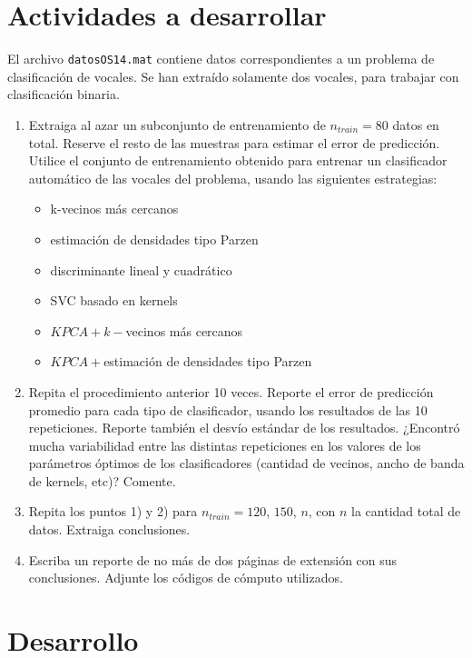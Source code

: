 \documentclass[fleqn,10pt]{SelfArx}
\begin{document}
\section*{Actividades a desarrollar} %
El archivo \texttt{datosOS14.mat} contiene datos correspondientes a un problema de clasificación de vocales. Se han extraído solamente dos vocales, para trabajar con clasificación binaria.
\begin{enumerate}
\item Extraiga al azar un subconjunto de entrenamiento de $n_{train} = 80$ datos en total. Reserve el resto de las muestras para estimar el error de predicción. Utilice el conjunto de entrenamiento obtenido para entrenar un clasificador automático de las vocales del problema, usando las siguientes estrategias:
\begin{itemize}
\item k-vecinos más cercanos
\item estimación de densidades tipo Parzen
\item discriminante lineal y cuadrático
\item SVC basado en kernels
\item $KPCA+k-$vecinos más cercanos
\item $KPCA+$estimación de densidades tipo Parzen
\end{itemize}

\item Repita el procedimiento anterior 10 veces. Reporte el error de predicción promedio para
cada tipo de clasificador, usando los resultados de las 10 repeticiones. Reporte también el desvío estándar de los resultados. ¿Encontró mucha variabilidad entre las distintas repeticiones en los valores de los parámetros óptimos de los clasificadores (cantidad de vecinos, ancho de banda de kernels, etc)? Comente.

\item Repita los puntos 1) y 2) para $n_{train} = 120$, $150$, $n$, con $n$ la cantidad total de datos. Extraiga conclusiones.

\item Escriba un reporte de no más de dos páginas de extensión con sus conclusiones. Adjunte los códigos de cómputo utilizados.
\end{enumerate}

\section*{Desarrollo}
\end{document}
